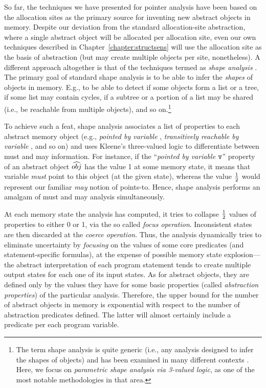 So far, the techniques we have presented for pointer analysis have
been based on the allocation sites as the primary source for inventing
new abstract objects in memory. Despite our deviation from the
standard allocation-site abstraction, where a single abstract object
will be allocated per allocation site, even our own techniques
described in Chapter~\ref{chapter:structsens} will use the allocation
site as the basis of abstraction (but may create multiple objects per
site, nonetheless). A different approach altogether is that of the
techniques termed as \emph{shape analysis}
\cite{toplas/SagivRW02,popl/SagivRW99,sas/ManevichSRF04,sas/Lev-AmiS00,toplas/SagivRW98,sefm/FerraraFJ12}.
The primary goal of standard shape analysis is to be able to infer the
\emph{shapes} of objects in memory. E.g., to be able to detect if some
objects form a list or a tree, if some list may contain cycles, if a
subtree or a portion of a list may be shared (i.e., be reachable from
multiple objects), and so on.\footnote{The term shape analysis is
  quite generic (i.e., any analysis designed to infer the shapes of
  objects) and has been examined in many different contexts
  \cite{popl/GhiyaH96}. Here, we focus on \emph{parametric shape
    analysis via 3-valued logic}, as one of the most notable
  methodologies in that area.}

To achieve such a feat, shape analysis associates a list of properties
to each abstract memory object (e.g., \emph{pointed by variable
  }, \emph{transitively reachable by variable }, and so
on) and uses Kleene's three-valued logic to differentiate between must
and may information. For instance, if the ``\emph{pointed by variable}
\(\texttt{v}\)'' property of an abstract object \(\widehat{obj}\) has the
value 1 at some memory state, it means that variable 
\emph{must} point to this object (at the given state), whereas the
value \(1\over{2}\) would represent our familiar \emph{may} notion of
points-to. Hence, shape analysis performs an amalgam of must and may
analysis simultaneously.

At each memory state the analysis has computed, it tries to collapse
\(1\over{2}\) values of properties to either 0 or 1, via the so called
\emph{focus operation}. Inconsistent states are then discarded at the
\emph{coerce operation}. Thus, the analysis dynamically tries to
eliminate uncertainty by \emph{focusing} on the values of some core
predicates (and statement-specific formulas), at the expense of
possible memory state explosion---the abstract interpretation of each
program statement tends to create multiple output states for each one
of its input states.  As for abstract objects, they are defined only
by the values they have for some basic properties (called
\emph{abstraction properties}) of the particular analysis. Therefore,
the upper bound for the number of abstract objects in memory is
exponential with respect to the number of abstraction predicates
defined. The latter will almost certainly include a predicate per each
program variable.

